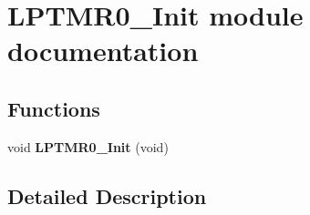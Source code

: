 \hypertarget{group___l_p_t_m_r0___init__module}{}\section{L\+P\+T\+M\+R0\+\_\+\+Init module documentation}
\label{group___l_p_t_m_r0___init__module}
\subsection*{Functions}
\begin{DoxyCompactItemize}
\item 
void {\bfseries L\+P\+T\+M\+R0\+\_\+\+Init} (void)\hypertarget{group___l_p_t_m_r0___init__module_ga9747bf681c6e94d7a72232f5d3c074b1}{}\label{group___l_p_t_m_r0___init__module_ga9747bf681c6e94d7a72232f5d3c074b1}

\end{DoxyCompactItemize}


\subsection{Detailed Description}

